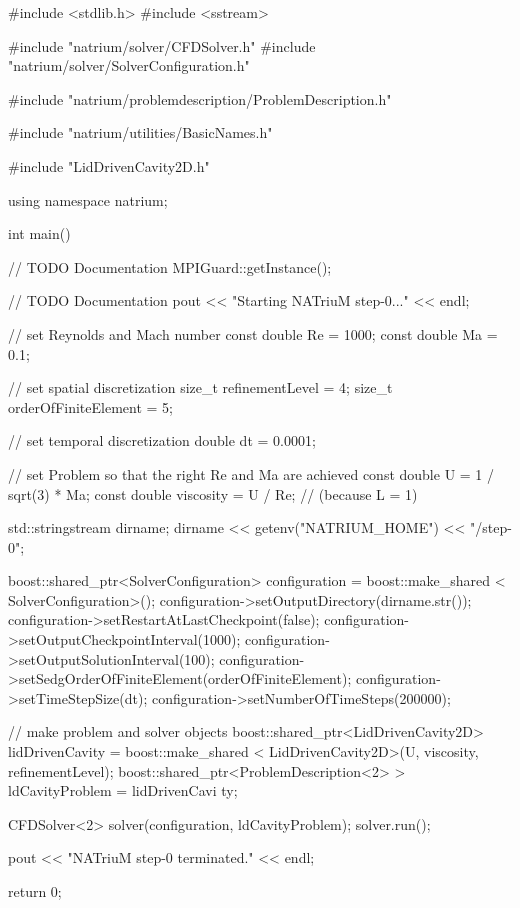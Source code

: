 \begin{DoxyCodeInclude}


#include <stdlib.h>
#include <sstream>

#include "natrium/solver/CFDSolver.h"
#include "natrium/solver/SolverConfiguration.h"

#include "natrium/problemdescription/ProblemDescription.h"

#include "natrium/utilities/BasicNames.h"

#include "LidDrivenCavity2D.h"

using namespace natrium;



int main() {
        // TODO Documentation
        MPIGuard::getInstance();

        // TODO Documentation
        pout << "Starting NATriuM step-0..." << endl;

        // set Reynolds and Mach number
        const double Re = 1000;
        const double Ma = 0.1;

        // set spatial discretization
        size_t refinementLevel = 4;
        size_t orderOfFiniteElement = 5;

        // set temporal discretization
        double dt = 0.0001;

        // set Problem so that the right Re and Ma are achieved
        const double U = 1 / sqrt(3) * Ma;
        const double viscosity = U / Re; // (because L = 1)

        std::stringstream dirname;
        dirname << getenv("NATRIUM_HOME") << "/step-0";

        boost::shared_ptr<SolverConfiguration> configuration = boost::make_shared
      <
                        SolverConfiguration>();
        configuration->setOutputDirectory(dirname.str());
        configuration->setRestartAtLastCheckpoint(false);
        configuration->setOutputCheckpointInterval(1000);
        configuration->setOutputSolutionInterval(100);
        configuration->setSedgOrderOfFiniteElement(orderOfFiniteElement);
        configuration->setTimeStepSize(dt);
        configuration->setNumberOfTimeSteps(200000);

        // make problem and solver objects
        boost::shared_ptr<LidDrivenCavity2D> lidDrivenCavity = boost::make_shared
      <
                        LidDrivenCavity2D>(U, viscosity, refinementLevel);
        boost::shared_ptr<ProblemDescription<2> > ldCavityProblem = lidDrivenCavi
      ty;

        CFDSolver<2> solver(configuration, ldCavityProblem);
        solver.run();

        pout << "NATriuM step-0 terminated." << endl;

        return 0;
}

\end{DoxyCodeInclude}
 